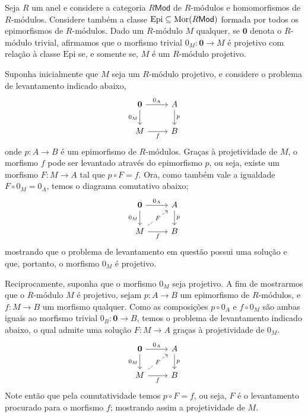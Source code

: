 \begin{exem}\label{exem:morfismo_zero_proj_sse_modulo_proj}
  Seja $R$ um anel e considere a categoria $R\mathsf{Mod}$ de $R$-módulos e homomorfismos de $R$-módulos.
  Considere também a classe $\mathrm{Epi} \subseteq \mathrm{Mor}(R\mathsf{Mod})$ formada por todos os epimorfismos de $R$-módulos.
  Dado um $R$-módulo $M$ qualquer, se $\mathbf{0}$ denota o $R$-módulo trivial, afirmamos que o morfismo trivial $0_M: \mathbf{0} \to M$ é projetivo com relação à classe $\mathrm{Epi}$ se, e somente se, $M$ é um $R$-módulo projetivo.

  Suponha inicialmente que $M$ seja um $R$-módulo projetivo, e considere o problema de levantamento indicado abaixo,
  \begin{displaymath}
    \begin{tikzcd}
      \mathbf{0}
      \arrow[r, "0_A"]
      \arrow[d, "0_M" swap]
      & A
      \arrow[d, "p"]
      \\ M
      \arrow[r, "f" swap]
      & B
    \end{tikzcd}
  \end{displaymath}
  onde $p: A \to B$ é um epimorfismo de $R$-módulos.
  Graças à projetividade de $M$, o morfismo $f$ pode ser levantado através do epimorfismo $p$, ou seja, existe um morfismo $F: M \to A$ tal que $p \circ F = f$.
  Ora, como também vale a igualdade $F \circ 0_M = 0_A$, temos o diagrama comutativo abaixo;
  \begin{displaymath}
    \begin{tikzcd}
      \mathbf{0}
      \arrow[r, "0_A"]
      \arrow[d, "0_M" swap]
      & A
      \arrow[d, "p"]
      \\ M
      \arrow[r, "f" swap]
      \arrow[ru, dashed, "F" description]
      & B
    \end{tikzcd}
  \end{displaymath}
  mostrando que o problema de levantamento em questão possui uma solução e que, portanto, o morfismo $0_M$ é projetivo.

  Reciprocamente, suponha que o morfismo $0_M$ seja projetivo.
  A fim de mostrarmos que o $R$-módulo $M$ é projetivo, sejam $p: A \to B$ um epimorfismo de $R$-módulos, e $f: M \to B$ um morfismo qualquer.
  Como as composições $p \circ 0_A$ e $f \circ 0_M$ são ambas iguais ao morfismo trivial $0_B: \mathbf{0} \to B$, temos o problema de levantamento indicado abaixo, o qual admite uma solução $F: M \to A$ graças à projetividade de $0_M$.
  \begin{displaymath}
    \begin{tikzcd}
      \mathbf{0}
      \arrow[r, "0_A"]
      \arrow[d, "0_M" swap]
      & A
      \arrow[d, "p"]
      \\ M
      \arrow[r, "f" swap]
      \arrow[ru, dashed, "F" description]
      & B
    \end{tikzcd}
  \end{displaymath}
  Note então que pela comutatividade temos $p \circ F = f$, ou  seja, $F$ é o levantamento procurado para o morfismo $f$; mostrando assim a projetividade de $M$.
\end{exem}

